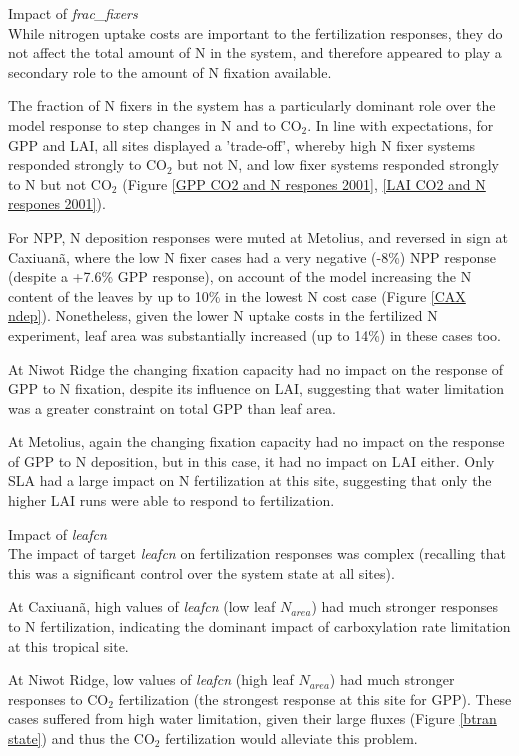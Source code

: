 \documentclass[draft,linenumbers]{agujournal}
\begin{document}
Impact of \emph{frac\_fixers}\\
While nitrogen uptake costs are important to the fertilization responses, they do not affect the total amount of N in the system, and therefore appeared to play a secondary role to the amount of N fixation available.

The fraction of N fixers in the system has a particularly dominant role over the model response to step changes in N and to CO$_{2}$. In line with expectations, for GPP and LAI, all sites displayed a 'trade-off', whereby high N fixer systems responded strongly to CO$_{2}$ but not N, and low fixer systems responded strongly to N but not CO$_{2}$ (Figure \ref{GPP CO2 and N respones 2001}, \ref{LAI CO2 and N respones 2001}). 

For NPP, N deposition responses were muted at Metolius, and reversed in sign at Caxiuan\~a, where the low N fixer cases had a very negative (-8\%) NPP response (despite a +7.6\% GPP response), on account of the model increasing the N content of the leaves by up to 10\% in the lowest N cost case (Figure \ref{CAX ndep}). Nonetheless, given the lower N uptake costs in the fertilized N experiment, leaf area was substantially increased (up to 14\%) in these cases too. 

At Niwot Ridge the changing fixation capacity had no impact on the response of GPP to N fixation, despite its influence on LAI, suggesting that water limitation was a greater constraint on total GPP than leaf area. 

At Metolius, again the changing fixation capacity had no impact on the response of GPP to N deposition, but in this case, it had no impact on LAI either. Only SLA had a large impact on N fertilization at this site, suggesting that only the higher LAI runs were able to respond to fertilization.  

Impact of \emph{leafcn}\\
The impact of target \emph{leafcn} on fertilization responses was complex (recalling that this was a significant control over the system state at all sites).

At Caxiuan\~a, high values of \emph{leafcn} (low leaf $N_{area}$) had much stronger responses to N fertilization, indicating the dominant impact of carboxylation rate limitation at this tropical site. 

At Niwot Ridge, low values of \emph{leafcn} (high leaf $N_{area}$) had much stronger responses to CO$_{2}$ fertilization (the strongest response at this site for GPP). These cases suffered from high water limitation, given their large fluxes (Figure \ref{btran state}) and thus the CO$_{2}$ fertilization would alleviate this problem. 
\end{document}
